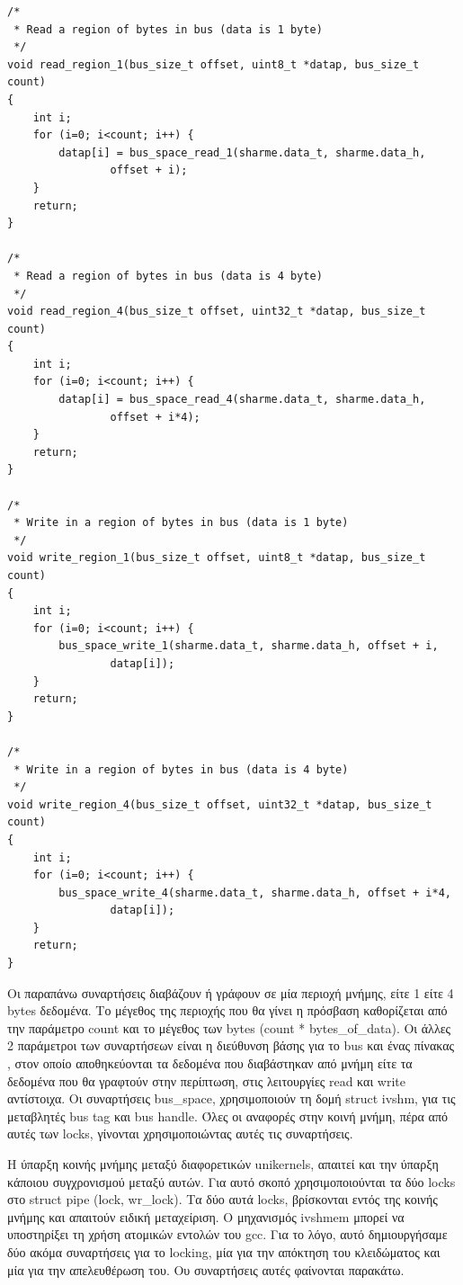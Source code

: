 \begin{lstlisting}
/*
 * Read a region of bytes in bus (data is 1 byte)
 */
void read_region_1(bus_size_t offset, uint8_t *datap, bus_size_t count)
{
	int i;
	for (i=0; i<count; i++) {
		datap[i] = bus_space_read_1(sharme.data_t, sharme.data_h,
				offset + i);
	}
	return;
}

/*
 * Read a region of bytes in bus (data is 4 byte)
 */
void read_region_4(bus_size_t offset, uint32_t *datap, bus_size_t count)
{
	int i;
	for (i=0; i<count; i++) {
		datap[i] = bus_space_read_4(sharme.data_t, sharme.data_h,
				offset + i*4);
	}
	return;
}

/*
 * Write in a region of bytes in bus (data is 1 byte)
 */
void write_region_1(bus_size_t offset, uint8_t *datap, bus_size_t count)
{
	int i;
	for (i=0; i<count; i++) {
		bus_space_write_1(sharme.data_t, sharme.data_h, offset + i,
				datap[i]);
	}
	return;
}

/*
 * Write in a region of bytes in bus (data is 4 byte)
 */
void write_region_4(bus_size_t offset, uint32_t *datap, bus_size_t count)
{
	int i;
	for (i=0; i<count; i++) {
		bus_space_write_4(sharme.data_t, sharme.data_h,	offset + i*4,
				datap[i]);
	}
	return;
}
\end{lstlisting}

Οι παραπάνω συναρτήσεις διαβάζουν ή γράφουν σε μία περιοχή μνήμης, είτε 1 είτε 4
bytes δεδομένα. Το μέγεθος της περιοχής που θα γίνει η πρόσβαση καθορίζεται από
την παράμετρο count και το μέγεθος των bytes (count * bytes\_of\_data). Οι άλλες
2 παράμετροι των συναρτήσεων είναι η διεύθυνση βάσης για το bus και ένας πίνακας
, στον οποίο αποθηκεύονται τα δεδομένα που διαβάστηκαν από μνήμη είτε τα
δεδομένα που θα γραφτούν στην περίπτωση, στις λειτουργίες read και write
αντίστοιχα. Οι συναρτήσεις bus\_space, χρησιμοποιούν τη δομή struct ivshm, για
τις μεταβλητές bus tag και bus handle. Όλες οι αναφορές στην κοινή μνήμη, πέρα
από αυτές των locks, γίνονται χρησιμοποιώντας αυτές τις συναρτήσεις.

Η ύπαρξη κοινής μνήμης μεταξύ διαφορετικών unikernels, απαιτεί και την ύπαρξη
κάποιου συγχρονισμού μεταξύ αυτών. Για αυτό σκοπό χρησιμοποιούνται τα δύο locks
στο struct pipe (lock, wr\_lock). Τα δύο αυτά locks, βρίσκονται εντός της κοινής
μνήμης και απαιτούν ειδική μεταχείριση. Ο μηχανισμός ivshmem μπορεί να
υποστηρίξει τη χρήση ατομικών εντολών του gcc. Για το λόγο, αυτό δημιουργήσαμε
δύο ακόμα συναρτήσεις για το locking, μία για την απόκτηση του κλειδώματος και
μία για την απελευθέρωση του. Ου συναρτήσεις αυτές φαίνονται παρακάτω. 


